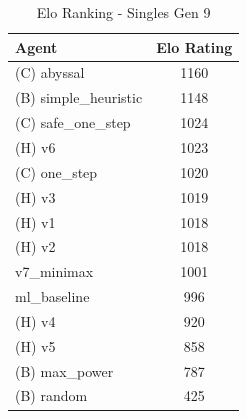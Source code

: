 \begin{table}[htbp]
\caption{Elo Ranking - Singles Gen 9}
\label{tab:elo_singles_gen_9}
\begin{tabular}{lc}
\toprule
Agent & Elo Rating \\
\midrule
(C) abyssal & 1160 \\
(B) simple\_heuristic & 1148 \\
(C) safe\_one\_step & 1024 \\
(H) v6 & 1023 \\
(C) one\_step & 1020 \\
(H) v3 & 1019 \\
(H) v1 & 1018 \\
(H) v2 & 1018 \\
v7\_minimax & 1001 \\
ml\_baseline & 996 \\
(H) v4 & 920 \\
(H) v5 & 858 \\
(B) max\_power & 787 \\
(B) random & 425 \\
\bottomrule
\end{tabular}
\end{table}
